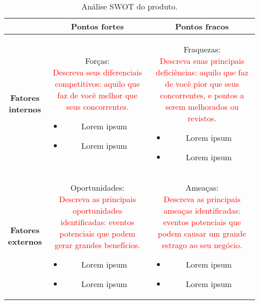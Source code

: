 \begin{table}[ht]
\centering
\caption{Análise SWOT do produto.}
\begin{tabular}{|c|c|c|} \hline
 & \textbf{Pontos fortes} & \textbf{Pontos fracos}  \\ \hline 
    {\parbox{0.1\textwidth}{ \textbf{Fatores \\ internos}}}  &
    {\parbox{0.4\textwidth}{ Forças: 
        \\ \textcolor{red}{Descreva seus diferenciais competitivos: aquilo que faz de você melhor que seus concorrentes.}
        \begin{itemize}
            \item Lorem ipsum
            \item Lorem ipsum
        \end{itemize} }} & 
    {\parbox{0.4\textwidth}{ Fraquezas:
        \\ \textcolor{red}{Descreva suas principais deficiências: aquilo que faz de você pior que seus concorrentes, e pontos a serem melhorados ou revistos.}
        \begin{itemize}
            \item Lorem ipsum
            \item Lorem ipsum
        \end{itemize} }}\\ \hline
    {\parbox{0.1\textwidth}{ \textbf{Fatores \\ externos}}}  &
    {\parbox{0.4\textwidth}{ Oportunidades:
        \\ \textcolor{red}{Descreva as principais oportunidades identificadas: eventos potenciais que podem gerar grandes benefícios.}
        \begin{itemize}
            \item Lorem ipsum 
            \item Lorem ipsum
        \end{itemize} }} & 
    {\parbox{0.4\textwidth}{ Ameaças:
        \\ \textcolor{red}{Descreva as principais ameaças identificadas: eventos potenciais que podem causar um grande estrago ao seu negócio.}
        \begin{itemize}
            \item Lorem ipsum 
            \item Lorem ipsum
        \end{itemize} }}\\ \hline
\end{tabular}
\label{tab:swot}
\end{table}


